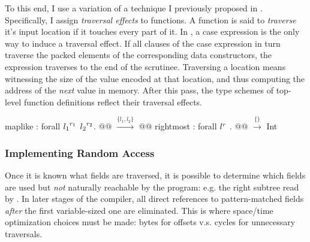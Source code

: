 To this end, I use a variation of a technique I previously proposed in
\cite{ecoop17-gibbon}.  Specifically, I assign \emph{traversal effects} to
functions.  A function is said to {\em traverse} it's input location if it
touches every part of it.  In \ourcalc{}, a case expression is the only way to
induce a traversal effect.  If all clauses of the case expression in turn
traverse the packed elements of the corresponding data constructors, the
expression traverses to the end of the scrutinee.
%
Traversing a location means witnessing the size of the value encoded at that
location, and thus computing the address of the \emph{next} value in memory.
%
After this pass, the type schemes of top-level function definitions reflect
their traversal effects.


\begin{code}
maplike : forall ${l_1}^{r_1}$ ${l_2}^{r_2}$. @@ $\xrightarrow{\{ l_1, l_2 \}}$ @@
rightmost : forall ${l}^{r}$ . @@ $\xrightarrow{\{\}}$ Int
\end{code}

\subsubsection{Implementing Random Access}
\label{sec:rand-access}

Once it is known what fields are traversed, it is possible to determine which fields are
used but \emph{not} naturally reachable by the program: e.g. the right subtree
read by .
%
In later stages of the compiler, all direct references to
pattern-matched fields {\em after} the first variable-sized one are eliminated.
%
This is where space/time optimization choices must be made:
bytes for offsets v.s. cycles for unnecessary traversals.

